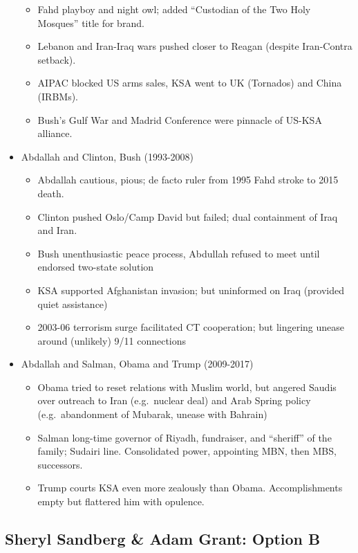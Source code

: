 \documentclass[
]{article}
\begin{document}
\begin{itemize}
  \begin{itemize}
  \item
    Fahd playboy and night owl; added ``Custodian of the Two Holy
    Mosques'' title for brand.
  \item
    Lebanon and Iran-Iraq wars pushed closer to Reagan (despite
    Iran-Contra setback).
  \item
    AIPAC blocked US arms sales, KSA went to UK (Tornados) and China
    (IRBMs).
  \item
    Bush's Gulf War and Madrid Conference were pinnacle of US-KSA
    alliance.
  \end{itemize}
\item
  Abdallah and Clinton, Bush (1993-2008)

  \begin{itemize}
  \item
    Abdallah cautious, pious; de facto ruler from 1995 Fahd stroke to
    2015 death.
  \item
    Clinton pushed Oslo/Camp David but failed; dual containment of Iraq
    and Iran.
  \item
    Bush unenthusiastic peace process, Abdullah refused to meet until
    endorsed two-state solution
  \item
    KSA supported Afghanistan invasion; but uninformed on Iraq (provided
    quiet assistance)
  \item
    2003-06 terrorism surge facilitated CT cooperation; but lingering
    unease around (unlikely) 9/11 connections
  \end{itemize}
\item
  Abdallah and Salman, Obama and Trump (2009-2017)

  \begin{itemize}
  \item
    Obama tried to reset relations with Muslim world, but angered Saudis
    over outreach to Iran (e.g.~nuclear deal) and Arab Spring policy
    (e.g.~abandonment of Mubarak, unease with Bahrain)
  \item
    Salman long-time governor of Riyadh, fundraiser, and ``sheriff'' of
    the family; Sudairi line. Consolidated power, appointing MBN, then
    MBS, successors.
  \item
    Trump courts KSA even more zealously than Obama. Accomplishments
    empty but flattered him with opulence.
  \end{itemize}
\end{itemize}

\hypertarget{sheryl-sandberg-adam-grant-option-b}{%
\subsection{Sheryl Sandberg \& Adam Grant: Option
B}\label{sheryl-sandberg-adam-grant-option-b}}
\end{document}
